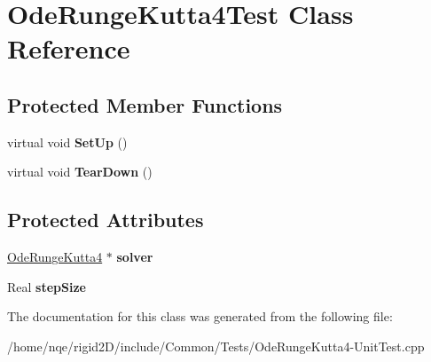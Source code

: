 \hypertarget{class_ode_runge_kutta4_test}{
\section{OdeRungeKutta4Test Class Reference}
\label{class_ode_runge_kutta4_test}
}
\subsection*{Protected Member Functions}
\begin{DoxyCompactItemize}
\item 
\hypertarget{class_ode_runge_kutta4_test_ae5281d5152d314bb9da9b29afbd7995b}{
virtual void {\bfseries SetUp} ()}
\label{class_ode_runge_kutta4_test_ae5281d5152d314bb9da9b29afbd7995b}

\item 
\hypertarget{class_ode_runge_kutta4_test_ae54aa939709faab8575b163ca0f81390}{
virtual void {\bfseries TearDown} ()}
\label{class_ode_runge_kutta4_test_ae54aa939709faab8575b163ca0f81390}

\end{DoxyCompactItemize}
\subsection*{Protected Attributes}
\begin{DoxyCompactItemize}
\item 
\hypertarget{class_ode_runge_kutta4_test_af19d736e2056b00ac65ef037c0ea83bf}{
\hyperlink{class_rigid2_d_1_1_ode_runge_kutta4}{OdeRungeKutta4} $\ast$ {\bfseries solver}}
\label{class_ode_runge_kutta4_test_af19d736e2056b00ac65ef037c0ea83bf}

\item 
\hypertarget{class_ode_runge_kutta4_test_a16925e11533c8d2ddcba0fe3b12d34bd}{
Real {\bfseries stepSize}}
\label{class_ode_runge_kutta4_test_a16925e11533c8d2ddcba0fe3b12d34bd}

\end{DoxyCompactItemize}


The documentation for this class was generated from the following file:\begin{DoxyCompactItemize}
\item 
/home/nqe/rigid2D/include/Common/Tests/OdeRungeKutta4-\/UnitTest.cpp\end{DoxyCompactItemize}
